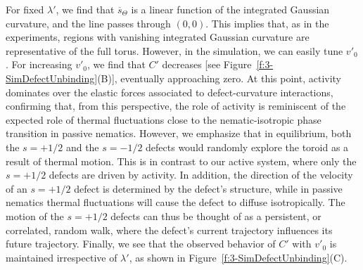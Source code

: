 For fixed $\lambda'$, we find that $\overbar{s}_{\Theta}$ is a linear function of the integrated Gaussian curvature, and the line passes through $(0,0)$.
This implies that, as in the experiments, regions with vanishing integrated Gaussian curvature are representative of the full torus.
However, in the simulation, we can easily tune $v'_0$.
For increasing $v'_0$, we find that $C'$ decreases [see Figure~\ref{f:3-SimDefectUnbinding}(B)], eventually approaching zero.
At this point, activity dominates over the elastic forces associated to defect-curvature interactions, confirming that, from this perspective, the role of activity is reminiscent of the expected role of thermal fluctuations close to the nematic-isotropic phase transition in passive nematics.
However, we emphasize that in equilibrium, both the $s = +1/2$ and the $s = -1/2$ defects would randomly explore the toroid as a result of thermal motion.
This is in contrast to our active system, where only the $s = +1/2$ defects are driven by activity.
In addition, the direction of the velocity of an $s = +1/2$ defect is determined by the defect's structure, while in passive nematics thermal fluctuations will cause the defect to diffuse isotropically.
The motion of the $s = +1/2$ defects can thus be thought of as a persistent, or correlated, random walk, where the defect's current trajectory influences its future trajectory.
Finally, we see that the observed behavior of $C'$ with $v'_0$ is maintained irrespective of $\lambda'$, as shown in Figure~\ref{f:3-SimDefectUnbinding}(C).


